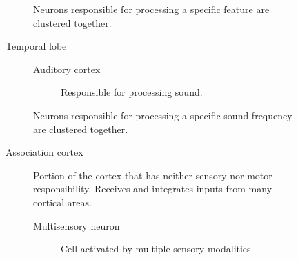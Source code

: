 \begin{description}
\begin{description}
\begin{description}
                    \begin{remark}
                        Neurons responsible for processing a specific feature are clustered together.
                    \end{remark}


                \item[Temporal lobe] 
                    \begin{description}
                        \item[Auditory cortex]
                            Responsible for processing sound.
                    \end{description}

                    \begin{remark}
                        Neurons responsible for processing a specific sound frequency are clustered together.
                    \end{remark}

                \item[Association cortex] 
                    Portion of the cortex that has neither sensory nor motor responsibility.
                    Receives and integrates inputs from many cortical areas.

                    \begin{description}
                        \item[Multisensory neuron]
                            Cell activated by multiple sensory modalities.
                    \end{description}
            \end{description}
    \end{description}
\end{description}